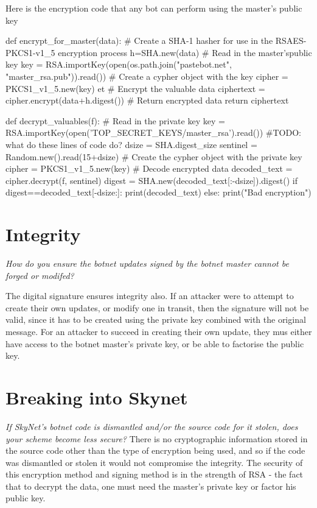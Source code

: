 \documentclass[9pt,a4paper]{article}
\begin{document}
Here is the encryption code that any bot can perform using the master's public key
\begin{center}
\vspace{-2ex}
\begin{python}
def encrypt_for_master(data):
    # Create a SHA-1 hasher for use in the RSAES-PKCS1-v1_5 encryption process
    h=SHA.new(data)
    # Read in the master'spublic key
    key = RSA.importKey(open(os.path.join("pastebot.net", "master_rsa.pub")).read())
    # Create a cypher object with the key
    cipher = PKCS1_v1_5.new(key)
et   # Encrypt the valuable data
    ciphertext = cipher.encrypt(data+h.digest())
    # Return encrypted data
    return ciphertext
\end{python}
\end{center}

\begin{center}
\vspace{-2ex}
\begin{python}
def decrypt_valuables(f):
    # Read in the private key
    key = RSA.importKey(open('TOP_SECRET_KEYS/master_rsa').read())
    #TODO: what do these lines of code do?
    dsize = SHA.digest_size
    sentinel = Random.new().read(15+dsize)
    # Create the cypher object with the private key
    cipher = PKCS1_v1_5.new(key)
    # Decode encrypted data
    decoded_text = cipher.decrypt(f, sentinel)
    digest = SHA.new(decoded_text[:-dsize]).digest()
    if digest==decoded_text[-dsize:]:
        print(decoded_text)
    else:
        print("Bad encryption")
\end{python}
\end{center}


\section{Integrity}

\emph{ How do you ensure the botnet updates signed by the botnet master cannot be forged or modifed?}

The digital signature ensures integrity also. If an attacker were to attempt to create their own updates, or modify one in transit, then the signature will not be valid, since it has to be created using the private key combined with the original message. For an attacker to succeed in creating their own update, they mus either have access to the botnet master's private key, or be able to factorise the public key.

\section{Breaking into Skynet}
\emph{If SkyNet's botnet code is dismantled and/or the source code for it stolen, does your scheme become less secure?}
There is no cryptographic information stored in the source code other than the type of encryption being used, and so if the code was dismantled or stolen it would not compromise the integrity. The security of this encryption method and signing method is in the strength of RSA - the fact that to decrypt the data, one must need the master's private key or factor his public key.
\end{document}
